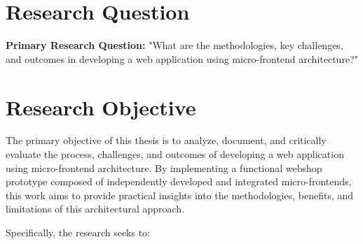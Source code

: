 \documentclass[12pt,a4paper]{report}
\begin{document}
\section{Research Question}
\textbf{Primary Research Question:} "What are the methodologies, key challenges, and outcomes in developing a web application using micro-frontend architecture?"

\section{Research Objective}
The primary objective of this thesis is to analyze, document, and critically evaluate the process, challenges, and outcomes of developing a web application using micro-frontend architecture. By implementing a functional webshop prototype composed of independently developed and integrated micro-frontends, this work aims to provide practical insights into the methodologies, benefits, and limitations of this architectural approach.

Specifically, the research seeks to:
\end{document}
